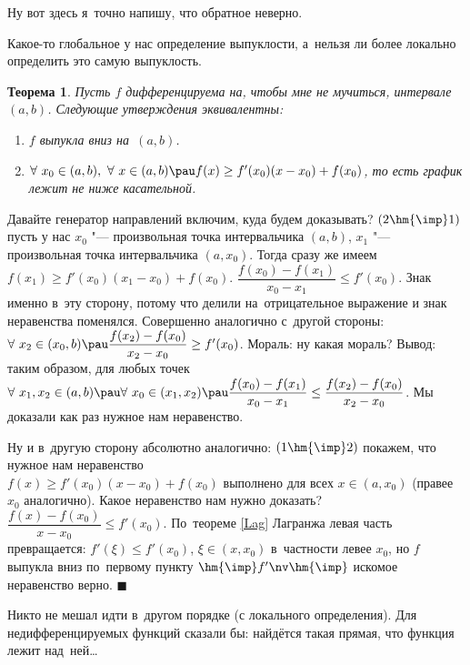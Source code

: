 \documentclass[a4paper,10pt,twoside]{article}
\newtheorem{The}{Теорема}[section]
\newenvironment{Proof}
       {\par\noindent{\textbf{Доказательство.}}}
       {\hfill$\scriptstyle\blacksquare$}
\begin{document}
Ну вот здесь я~точно напишу, что обратное неверно.

Какое-то глобальное у нас определение выпуклости, а~нельзя ли более локально определить это самую выпуклость.

\begin{The}
    Пусть $f$ дифференцируема на, чтобы мне не мучиться, интервале $(a,b)$. Следующие утверждения эквивалентны:

    \begin{enumerate}
        \item $f$ выпукла вниз на~$(a,b)$.

        \item $\forall\  x_0\in(a,b),\ \forall\  x\in(a,b)\pau f(x)\geq f'(x_0)(x-x_0)+f(x_0)$, то есть график лежит не ниже касательной.
    \end{enumerate}

\end{The}

\begin{Proof}
    Давайте генератор направлений включим, куда будем доказывать? $(2\hm{\imp}1)$ пусть у нас $x_0$  "--- произвольная точка интервальчика $(a,b)$, $x_1$ "--- произвольная точка интервальчика $(a,x_0)$.
    Тогда сразу же имеем $f(x_1)\geq f'(x_0)(x_1-x_0)+f(x_0)$. $\dfrac{f(x_0)-f(x_1)}{x_0-x_1}\leq f'(x_0)$. Знак именно в~эту сторону, потому что делили на~отрицательное выражение
    и знак неравенства поменялся. Совершенно аналогично с~другой стороны: $\forall\  x_2\in(x_0,b)\pau \dfrac{f(x_2)-f(x_0)}{x_2-x_0}\geq f'(x_0)$. Мораль: ну какая мораль? Вывод:
    таким образом, для любых точек $\forall\  x_1,x_2\in(a,b)\pau \forall\  x_0\in(x_1,x_2)\pau \dfrac{f(x_0)-f(x_1)}{x_0-x_1}\leq\dfrac{f(x_2)-f(x_0)}{x_2-x_0}$. Мы
    доказали как раз нужное нам неравенство.

    Ну и в~другую сторону абсолютно аналогично: $(1\hm{\imp}2)$ покажем, что нужное нам неравенство \\$f(x)\geq f'(x_0)(x-x_0)+f(x_0)$ выполнено для
    всех $x\in(a,x_0)$ (правее $x_0$ аналогично). Какое неравенство нам нужно доказать? $\dfrac{f(x)-f(x_0)}{x-x_0}\leq f'(x_0)$. По~теореме \ref{Lag} Лагранжа
    левая часть превращается: $f'(\xi)\leq f'(x_0)$, $\xi\in(x,x_0)$ в~частности левее $x_0$, но $f$ выпукла вниз по~первому пункту $\hm{\imp} f'\nv\hm{\imp}$ искомое неравенство верно.
\end{Proof}

Никто не мешал идти в~другом порядке (с локального определения). Для недифференцируемых функций сказали бы: найдётся такая прямая, что функция лежит над~ней\ldots
\end{document}

